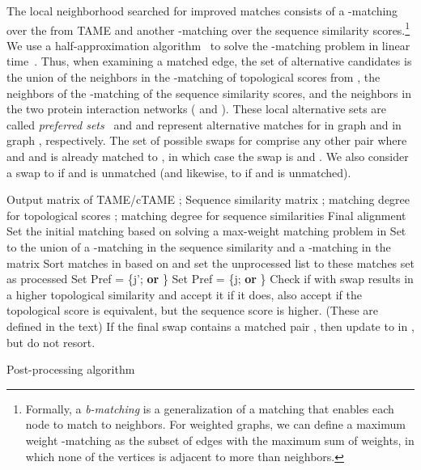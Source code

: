 \documentclass[10pt, journal, compsoc, final]{IEEEtran}
\begin{document}
The local neighborhood searched for improved matches consists of a -matching over the  from TAME and another -matching over the sequence similarity scores.\footnote{Formally, a \emph{b-matching} is a generalization of a matching that enables each node to match to  neighbors. For weighted graphs, we can define a maximum weight -matching as the subset of edges with the maximum sum of weights, in which none of the vertices is adjacent to more than  neighbors.} We use a half-approximation algorithm~\cite{bMatching} to solve the -matching problem in linear time~\cite{Arif}. Thus, when examining a matched edge, the set of alternative candidates is the union of the neighbors in the -matching of topological scores from , the neighbors of the -matching of the sequence similarity scores, and the neighbors in the two protein interaction networks ( and ).  These local alternative sets are called \emph{preferred sets}~\cite{PISWAP} and  and  represent alternative matches for  in graph  and  in graph , respectively. The set of possible swaps for  comprise any other pair  where  and  and  is already matched to , in which case the swap is  and . We also consider a swap  to  if  and  is unmatched (and likewise,  to  if  and  is unmatched). 




\begin{algorithm}
\centering\footnotesize
\begin{algorithmic}[1]
\REQUIRE Output matrix of TAME/cTAME ; Sequence similarity matrix ; matching degree for topological scores ; matching degree for sequence similarities 
\ENSURE Final alignment 
\STATE Set the initial matching  based on solving a max-weight matching problem in 
\STATE Set  to the union of a -matching in the sequence similarity  and a -matching in the matrix 
\STATE Sort matches in  based on  and set the unprocessed list  to these matches
\STATE set  as processed 
\STATE Set Pref = \{j';  \textbf{or} \}
\STATE Set Pref = \{j;  \textbf{or} \}
\STATE Check if  with swap  results in a higher topological similarity and accept it if it does, also accept if the topological score is equivalent, but the sequence score is higher. (These are defined in the text)
\ENDFOR
\STATE If the final swap  contains a matched pair , then update  to  in , but do not resort.
\ENDFOR
\ENDFOR
\RETURN 
\end{algorithmic}
\caption{Post-processing algorithm}
\label{alg:postProc}
\end{algorithm}
\end{document}
